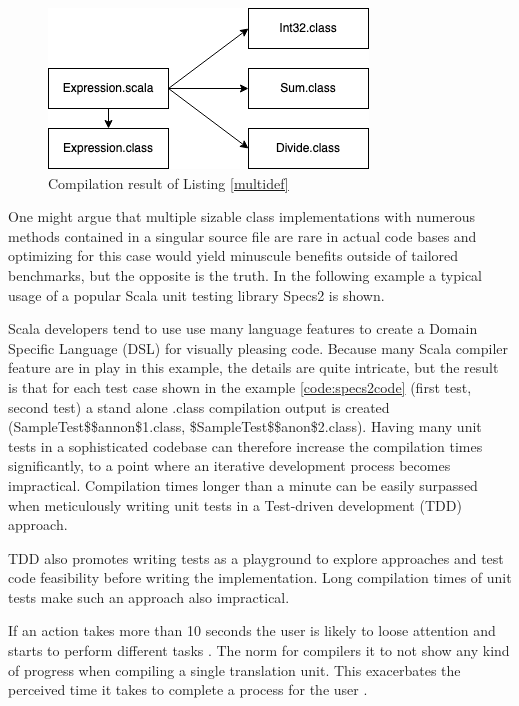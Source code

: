 \documentclass{VUMIFPSbakalaurinis}
\begin{document}
\begin{figure}[H]
    \centering
    \includegraphics[scale=0.6]{img/Expression}
    \caption{Compilation result of Listing \ref{multidef}}
    \label{img:Expression}
\end{figure}

One might argue that multiple sizable class implementations with numerous methods contained in a singular source file are rare in actual code bases and optimizing for this case would yield minuscule benefits outside of tailored benchmarks, but the opposite is the truth. %
In the following example a typical usage of a popular Scala unit testing library Specs2 \cite{Specs2Github} is shown.



Scala developers tend to use use many language features to create a Domain Specific Language (DSL) for visually pleasing code.
Because many Scala compiler feature are in play in this example, the details are quite intricate, but the result is that for each test case shown in the example \ref{code:specs2code} (first test, second test) a stand alone .class compilation output is created (SampleTest\$\$annon\$1.class, \$SampleTest\$\$anon\$2.class).
Having many unit tests in a sophisticated codebase can therefore increase the compilation times significantly, to a point where an iterative development process becomes impractical.
Compilation times longer than a minute can be easily surpassed when meticulously writing unit tests in a Test-driven development (TDD) approach.

TDD also promotes writing tests as a playground to explore approaches and test code feasibility before writing the implementation.
Long compilation times of unit tests make such an approach also impractical.

If an action takes more than 10 seconds the user is likely to loose attention and starts to perform different tasks \cite{Usability}.
The norm for compilers it to not show any kind of progress when compiling a single translation unit.
This exacerbates the perceived time it takes to complete a process for the user \cite{Usability}.
\end{document}
